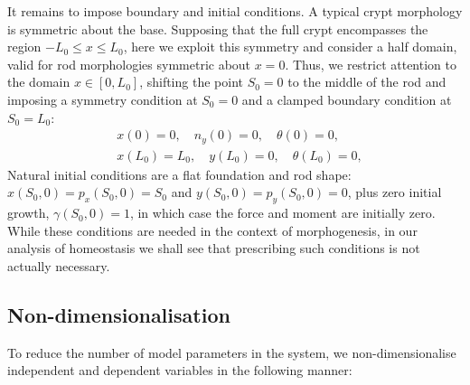It remains to impose boundary and initial conditions. A typical crypt morphology is symmetric about the base. Supposing that the full crypt encompasses the region $-L_0\leq x\leq L_0$, here we exploit this symmetry and consider a half domain, valid for rod morphologies symmetric about $x = 0$. Thus, we restrict attention to the domain $x\in [0, L_0]$, shifting the point $S_0=0$ to the middle of the rod and imposing a symmetry condition at $S_0=0$ and a clamped boundary condition at $S_0=L_0$:
\begin{align}
&x(0) = 0, \quad n_y(0) = 0, \quad \theta(0) = 0,\nonumber\\
&x(L_0) = L_0, \quad y(L_0) = 0, \quad \theta(L_0) = 0,\label{eq:dimBCs}
\end{align}
Natural initial conditions are a flat foundation and rod shape: $x(S_0,0)=p_x(S_0, 0) = S_0$ and $y(S_0, 0) =p_y(S_0, 0) = 0$, plus zero initial growth, $\gamma(S_0,0)=1$, in which case the force and moment are initially zero. While these conditions are needed in the context of morphogenesis, in our analysis of homeostasis we shall see that prescribing such conditions is not actually necessary.

\subsection{Non-dimensionalisation}	
To reduce the number of model parameters in the system, we non-dimensionalise independent and dependent variables in the following manner:

